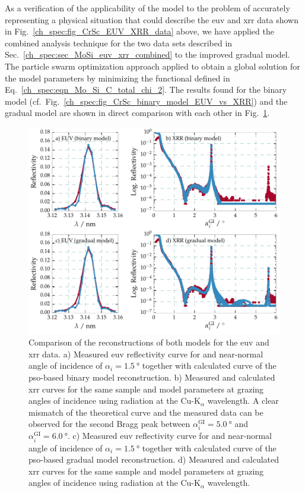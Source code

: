 As a verification of the applicability of the model to the problem of accurately representing a physical situation that could describe the \gls{euv} and \gls{xrr} data shown in Fig.~\ref{ch_spec:fig_CrSc_EUV_XRR_data} above, we have applied the combined analysis technique for the two data sets described in Sec.~\ref{ch_spec:sec_MoSi_euv_xrr_combined} to the improved gradual model. The particle swarm optimization approach applied to obtain a global solution for the model parameters by minimizing the functional defined in Eq.~\eqref{ch_spec:eqn_Mo_Si_C_total_chi_2}. The results found for the binary model (cf.~Fig.~\ref{ch_spec:fig_CrSc_binary_model_EUV_vs_XRR}) and the gradual model are shown in direct comparison with each other in Fig.~\ref{ch_spec:fig_CrSc_bianry_vs_gradual_model_fits}.
\begin{figure}[htbp]
  \centering
  \includegraphics[width=\textwidth]{img/CrSc_bianry_vs_gradual_model_fits}
  \caption{Comparison of the reconstructions of both models for the \gls{euv} and \gls{xrr} data. a) Measured \gls{euv} reflectivity curve for and near-normal angle of incidence of $\alpha_i=\SI{1.5}{\degree}$ together with calculated curve of the \gls{pso}-based binary model reconstruction. b) Measured and calculated \gls{xrr} curves for the same sample and model parameters at grazing angles of incidence using radiation at the Cu-K$_\alpha$ wavelength. A clear mismatch of the theoretical curve and the measured data can be observed for the second Bragg peak between $\alpha_i^\text{GI} = \SI{5.0}{\degree}$ and $\alpha_i^\text{GI} = \SI{6.0}{\degree}$.
  c) Measured \gls{euv} reflectivity curve for and near-normal angle of incidence of $\alpha_i=\SI{1.5}{\degree}$ together with calculated curve of the \gls{pso}-based gradual model reconstruction. d) Measured and calculated \gls{xrr} curves for the same sample and model parameters at grazing angles of incidence using radiation at the Cu-K$_\alpha$ wavelength.}
  \label{ch_spec:fig_CrSc_bianry_vs_gradual_model_fits}
\end{figure}
